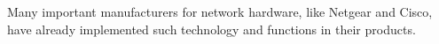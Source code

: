 				Many important manufacturers for network hardware, like Netgear and Cisco, have already implemented such technology and functions in their products.
						
						
%			
%
%				
%				
%				
%				
%				
%				
%				
%				
%				
%	
%	
%				
%				
%				
%				
